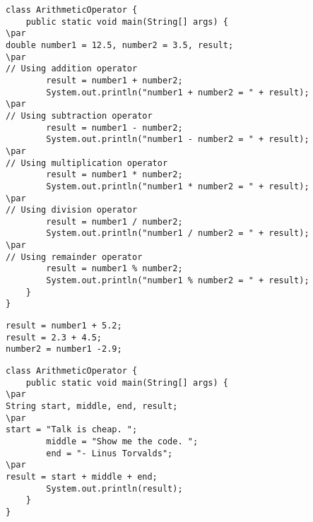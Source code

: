 \documentclass{book}
\def\lthtmlcheckvsize{\ifdim\ht\sizebox<\vsize 
  \ifdim\wd\sizebox<\hsize\expandafter\hfill\fi \expandafter\vfill
  \else\expandafter\vss\fi}%
\begin{document}
{\newpage\clearpage
{}%
\begin{lstlisting}
class ArithmeticOperator {
    public static void main(String[] args) {
\par
double number1 = 12.5, number2 = 3.5, result;
\par
// Using addition operator
        result = number1 + number2;
        System.out.println("number1 + number2 = " + result);
\par
// Using subtraction operator
        result = number1 - number2;
        System.out.println("number1 - number2 = " + result);
\par
// Using multiplication operator
        result = number1 * number2;
        System.out.println("number1 * number2 = " + result);
\par
// Using division operator
        result = number1 / number2;
        System.out.println("number1 / number2 = " + result);
\par
// Using remainder operator
        result = number1 % number2;
        System.out.println("number1 % number2 = " + result);
    }
}
\end{lstlisting}%
\lthtmlfigureZ
\lthtmlcheckvsize\clearpage}

{\newpage\clearpage
{}%
\begin{lstlisting}
result = number1 + 5.2;
result = 2.3 + 4.5;
number2 = number1 -2.9;
\end{lstlisting}%
\lthtmlfigureZ
\lthtmlcheckvsize\clearpage}

{\newpage\clearpage
{}%
\begin{lstlisting}
class ArithmeticOperator {
    public static void main(String[] args) {
\par
String start, middle, end, result;
\par
start = "Talk is cheap. ";
        middle = "Show me the code. ";
        end = "- Linus Torvalds";
\par
result = start + middle + end;
        System.out.println(result);
    }
}
\end{lstlisting}%
\lthtmlfigureZ
\lthtmlcheckvsize\clearpage}
\end{document}
